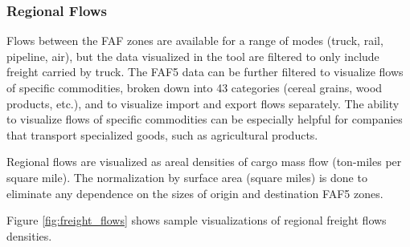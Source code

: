 \subsubsection{Regional Flows}
Flows between the FAF zones are available for a range of modes (truck, rail, pipeline, air), but the data visualized in the tool are filtered to only include freight carried by truck. The FAF5 data can be further filtered to visualize flows of specific commodities, broken down into 43 categories (cereal grains, wood products, etc.), and to visualize import and export flows separately. The ability to visualize flows of specific commodities can be especially helpful for companies that transport specialized goods, such as agricultural products. 

Regional flows are visualized as areal densities of cargo mass flow (ton-miles per square mile). The normalization by surface area (square miles) is done to eliminate any dependence on the sizes of origin and destination FAF5 zones. 

Figure \ref{fig:freight_flows} shows sample visualizations of regional freight flows densities. 

